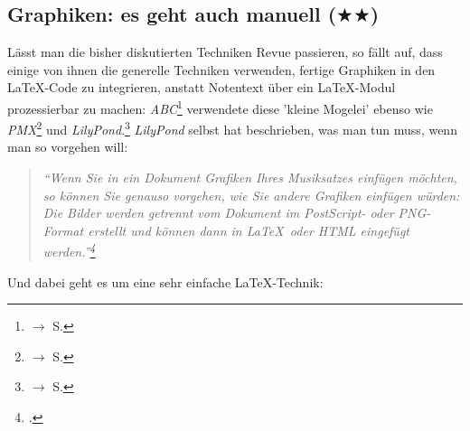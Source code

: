 %
%
%


\subsection{Graphiken: es geht auch manuell ($\bigstar\bigstar$)}
\label{IncludeGraphics}

Lässt man die bisher diskutierten Techniken Revue passieren, so fällt auf, dass
einige von ihnen die generelle Techniken verwenden, fertige Graphiken in den
\LaTeX-Code zu integrieren, anstatt Notentext über ein \LaTeX-Modul prozessierbar
zu machen: \textit{ABC}\footnote{$\rightarrow$ S. \pageref{AbcGraphics}}
verwendete diese 'kleine Mogelei' ebenso wie \textit{PMX}\footnote{$\rightarrow$
S. \pageref{PmxGraphics}} und \textit{LilyPond}.\footnote{$\rightarrow$ S.
\pageref{LilyPondGraphics}} \textit{LilyPond} selbst hat beschrieben, was man tun
muss, wenn man so vorgehen will:

\begin{quote}\textit{\enquote{Wenn Sie in ein Dokument Grafiken Ihres
Musiksatzes einfügen möchten, so können Sie genauso vorgehen, wie Sie andere
Grafiken einfügen würden: Die Bilder werden getrennt vom Dokument im PostScript-
oder PNG-Format erstellt und können dann in \LaTeX\ oder HTML eingefügt
werden.}\footcite[vgl.][20]{LilyPond2018e} }\end{quote}

Und dabei geht es um eine sehr einfache \LaTeX-Technik:

